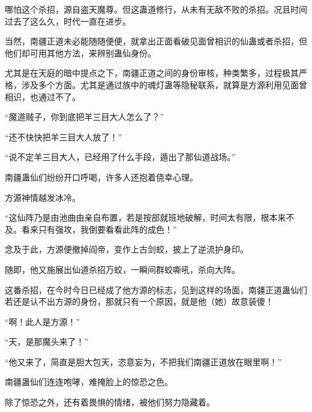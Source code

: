 \begin{this_body}
哪怕这个杀招，源自盗天魔尊。但这蛊道修行，从未有无敌不败的杀招。况且时间过去了这么久，时代一直在进步。

当然，南疆正道未必能随随便便，就拿出正面看破见面曾相识的仙蛊或者杀招，但他们却可用其他方法，来辨别蛊仙身份。

尤其是在天庭的暗中提点之下，南疆正道之间的身份审核，种类繁多，过程极其严格，涉及多个方面。尤其是通过族中的魂灯蛊等隐秘联系，就算是方源利用见面曾相识，也通过不了。

“魔道贼子，你到底把羊三目大人怎么了？”

“还不快快把羊三目大人放了！”

“说不定羊三目大人，已经用了什么手段，遁出了那仙道战场。”

南疆蛊仙们纷纷开口呼喝，许多人还抱着侥幸心理。

方源神情越发冰冷。

“这仙阵乃是由池曲由亲自布置，若是按部就班地破解，时间太有限，根本来不及。看来只有强攻，我倒要看看此阵的成色！”

念及于此，方源便撤掉阎帝，变作上古剑蛟，披上了逆流护身印。

随即，他又施展出仙道杀招万蛟，一瞬间群蛟嘶吼，杀向大阵。

这番杀招，在今时今日已经成了他方源的标志，见到这样的场面，南疆正道蛊仙们若还是认不出方源的身份，那就只有一个原因，就是他（她）故意装傻！

“啊！此人是方源！”

“天，是那魔头来了！”

“他又来了，简直是胆大包天，恣意妄为，不把我们南疆正道放在眼里啊！”

南疆蛊仙们连连咆哮，难掩脸上的惊恐之色。

除了惊恐之外，还有着畏惧的情绪，被他们努力隐藏着。

\end{this_body}

